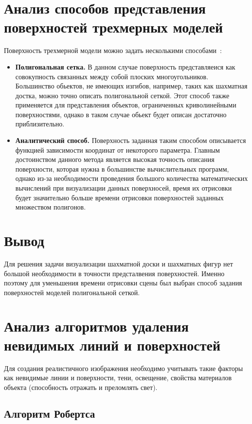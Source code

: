 \section{Анализ способов представления поверхностей трехмерных моделей}
Поверхность трехмерной модели можно задать несколькими способами~\cite{deymin}:
\begin{itemize}
	\item \textbf{Полигональная сетка.} В данном случае поверхность представляеися как совокупность связанных между собой плоских многоугольников. Большинство обьектов, не имеющих изгибов, например, таких как шахматная достка, можно точно описать полигональной сеткой. Этот способ также применяется для представления объектов, ограниченных криволинейными
	поверхностями, однако в таком случае обьект будет описан достаточно приблизительно.
	
	\item \textbf{Аналитический способ.} Поверхность заданная таким способом описывается функцией зависимости координат от некоторого параметра. Главным достоинством данного метода является высокая точность описания поверхности, которая нужна в большинстве вычислительных программ, однако из-за необходимости проведения большого количества математических вычислений при визуализации данных поверхносей, время их отрисовки будет значительно больше времени отрисовки поверхностей заданных множеством полигонов.
\end{itemize}

\section*{Вывод}
Для решения задачи визуализации шахматной доски и шахматных фигур нет большой необходимости в точности предсталвения поверхностей. Именно поэтому для уменьшения времени отрисовки сцены был выбран способ задания поверхностей моделей полигональной сеткой.

\clearpage
\section{Анализ алгоритмов удаления невидимых линий и поверхностей}
Для создания реалистичного изображения необходимо учитывать такие факторы как невидимые линии и поверхности, тени, освещение, свойства материалов объекта (способность отражать и преломлять свет).

\subsection{Алгоритм Робертса}

